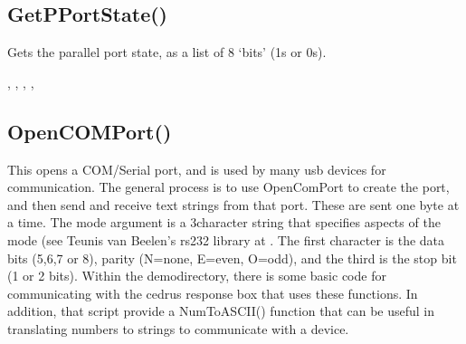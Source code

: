 \documentclass[letterpaper,10pt,english]{sphinxmanual}
\begin{document}
\subsection{GetPPortState()}
\label{\detokenize{reference/peblstream:getpportstate}}\label{\detokenize{reference/peblstream:index-25}}
\sphinxAtStartPar
{}

\sphinxAtStartPar
{}

\sphinxAtStartPar
Gets the parallel port state, as a list of 8 ‘bits’ (1s or 0s).

\sphinxAtStartPar
{}

\sphinxAtStartPar
{}, ,  , , 

\ignorespaces 

\subsection{OpenCOMPort()}
\label{\detokenize{reference/peblstream:opencomport}}\label{\detokenize{reference/peblstream:index-26}}
\sphinxAtStartPar
{}

\sphinxAtStartPar
{}

\sphinxAtStartPar
This opens a COM/Serial port, and is used by many usb devices for communication.  The general process is to use OpenComPort to create the port, and then send and receive text strings from that port.  These are sent one byte at a time. The mode argument is a 3\sphinxhyphen{}character string that specifies aspects of the mode (see  Teunis van Beelen’s rs232 library at . The first character is the data bits (5,6,7 or 8), parity (N=none, E=even, O=odd), and the third is the stop bit (1 or 2 bits).   Within the demodirectory, there is some basic code for communicating with the cedrus response box that uses these functions.  In addition, that script provide a NumToASCII() function that can be useful in translating numbers to strings to communicate with a device.

\sphinxAtStartPar
{}

\begin{sphinxVerbatim}[commandchars=\\\{\}]
\end{sphinxVerbatim}
\end{document}
